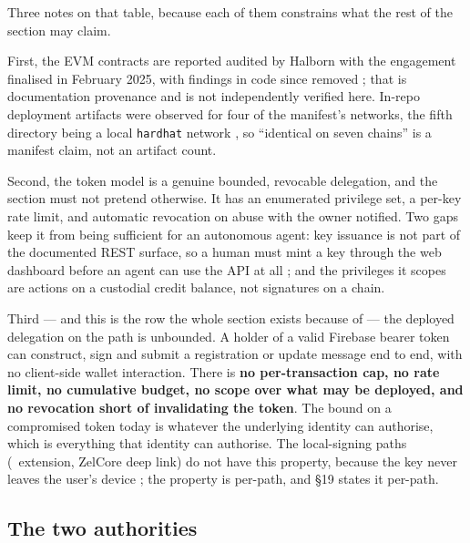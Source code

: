 Three notes on that table, because each of them constrains what the rest of the section may claim.

First, the EVM contracts are reported audited by Halborn with the engagement finalised in February
2025, with findings in code since removed ;
that is documentation provenance and is not independently verified here. In-repo deployment
artifacts were observed for four of the manifest's networks, the fifth directory being a local
\texttt{hardhat} network
, so ``identical on seven chains'' is a
manifest claim, not an artifact count.

Second, the \FluxEdge token model is a genuine bounded, revocable delegation, and the section must
not pretend otherwise. It has an enumerated privilege set, a per-key rate limit, and automatic
revocation on abuse with the owner notified. Two gaps keep it from being sufficient for an
autonomous agent: key issuance is not part of the documented REST surface, so a human must mint a key
through the web dashboard before an agent can use the API at all
; and the privileges it scopes are actions on a
custodial credit balance, not signatures on a chain.

Third — and this is the row the whole section exists because of — the deployed delegation on the
\FluxCore path is unbounded. A holder of a valid Firebase bearer token can construct, sign and submit
a registration or update message end to end, with no client-side wallet interaction. There is
\textbf{no per-transaction cap, no rate limit, no cumulative budget, no scope over what may be
deployed, and no revocation short of invalidating the token}. The bound on a compromised token today
is whatever the underlying identity can authorise, which is everything that identity can authorise.
The local-signing paths (\SSP\ extension, ZelCore deep link) do not have this property, because the
key never leaves the user's device ;
the property is per-path, and \S19 states it per-path.

\subsection{The two authorities}
\label{sec:agent-identity:two}

